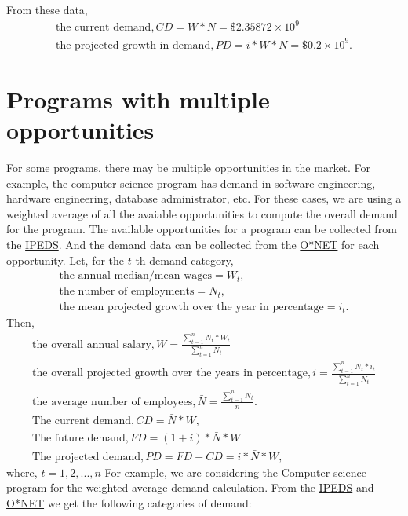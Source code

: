 \documentclass{article}
\begin{document}
From these data,
\begin{align*}
\text{the current demand}, CD=W*N=\$2.35872\times10^9\\
\text{the projected growth in demand}, PD=i*W*N=\$0.2\times10^9.
\end{align*}

\section{Programs with multiple opportunities}
For some programs, there may be multiple opportunities in the market. For example, the computer science program has demand in software engineering, hardware engineering, database administrator, etc. For these cases, we are using a weighted average of all the avaiable opportunities to compute the overall demand for the program. The available opportunities for a program can be collected from the \href{https://nces.ed.gov/ipeds/cipcode/default.aspx?y=55}{IPEDS}. And the demand data can be collected from the \href{https://www.onetonline.org/}{O*NET} for each opportunity.
Let, for the $t$-th demand category,
\begin{align*}
\text{the annual median/mean wages}= W_t,\\
\text{the number of employments}=N_t,\\
\text{the mean projected growth over the year in percentage} = i_t.
\end{align*}
Then,
\begin{align*}
\text{the overall annual salary},
W=\frac{\sum_{t=1}^n N_t*W_t}{\sum_{t=1}^n N_t}\\
\text{the overall projected growth over the years in percentage},
i=\frac{\sum_{t=1}^n N_t*i_t}{\sum_{t=1}^n N_t}\\
\text{the average number of employees},\bar{N}=\frac{\sum_{t=1}^n N_t}{n}.\\
\text{The current demand}, CD=\bar{N}*W,\\
\text{The future demand},  FD=(1+i)*\bar{N}*W\\
\text{The projected demand}, PD=FD-CD=i*\bar{N}*W,
\end{align*}
where, $t=1,2,...,n$
For example, we are considering the Computer science program for the weighted average demand calculation. From the \href{https://nces.ed.gov/ipeds/cipcode/default.aspx?y=55}{IPEDS}  and \href{https://www.onetonline.org/}{O*NET} we get the following categories of demand:
\newpage
\end{document}
